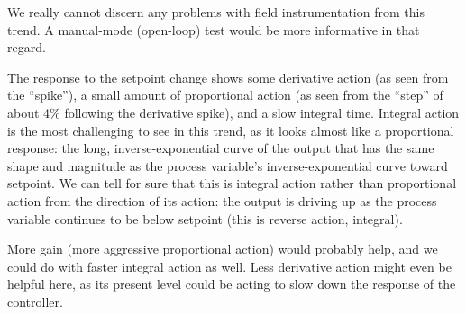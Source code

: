 \vskip 10pt

We really cannot discern any problems with field instrumentation from this trend.  A manual-mode (open-loop) test would be more informative in that regard.

\vskip 10pt

The response to the setpoint change shows some derivative action (as seen from the ``spike''), a small amount of proportional action (as seen from the ``step'' of about 4\% following the derivative spike), and a slow integral time.  Integral action is the most challenging to see in this trend, as it looks almost like a proportional response: the long, inverse-exponential curve of the output that has the same shape and magnitude as the process variable's inverse-exponential curve toward setpoint.  We can tell for sure that this is integral action rather than proportional action from the direction of its action: the output is driving up as the process variable continues to be below setpoint (this is reverse action, integral).

\vskip 10pt

More gain (more aggressive proportional action) would probably help, and we could do with faster integral action as well.  Less derivative action might even be helpful here, as its present level could be acting to slow down the response of the controller.











